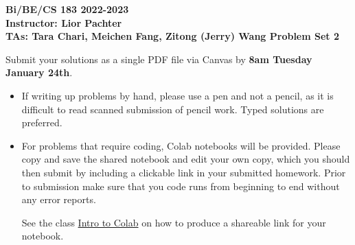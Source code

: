 \documentclass[11pt]{exam}
\begin{document}
\begin{center}

     \textbf{Bi/BE/CS 183 2022-2023\\ Instructor: Lior Pachter\\ TAs: Tara Chari, Meichen Fang, Zitong (Jerry) Wang \vskip 0.15in Problem Set 2}

\end{center}
Submit your solutions as a single PDF file via Canvas by {\bf 8am Tuesday January 24th}. 
\begin{itemize}
  \item If writing up problems by hand, please use a pen and not a pencil, as it is difficult to read scanned submission of pencil work. Typed solutions are preferred.
  \item For problems that require coding, Colab notebooks will be provided. Please copy and save the shared notebook and edit your own copy, which you should then submit by including a clickable link in your submitted homework. Prior to submission make sure that you code runs from beginning to end without any error reports.
  
  See the class \href{https://caltech.instructure.com/courses/5055}{Intro to Colab} on how to produce a shareable link for your notebook.

\end{itemize}
  
\end{document}
